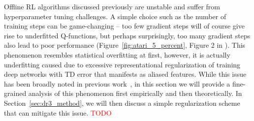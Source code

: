 Offline RL algorithms discussed previously are unstable and suffer from hyperparameter tuning challenges. A simple choice such as the number of training steps can be game-changing -- too few gradient steps will of course give rise to underfitted Q-functions, but perhaps surprisingly, too many gradient steps also lead to poor performance (Figure~\ref{fig:atari_5_percent}, Figure 2 in \citep{kumar2021implicit}). This phenomenon resembles statistical overfitting at first, however, it is actually underfitting caused due to excessive representational regularization of training deep networks with TD error that manifests as aliased features. While this issue has been broadly noted in previous work~\citep{kumar2021implicit}, in this section we will provide a fine-grained analysis of this phenomenon first empirically and then theoretically. In Section~\ref{sec:dr3_method}, we will then discuss a simple regularization scheme that can mitigate this issue. \textcolor{red}{TODO}  


